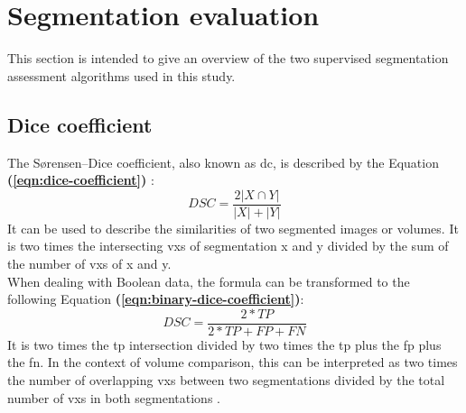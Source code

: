\section{Segmentation evaluation}\label{s:b-seg-eval}
This section is intended to give an overview of the two supervised segmentation assessment algorithms used in this study.

\subsection{Dice coefficient}
The S\o{}rensen–Dice coefficient, also known as \acrfull{dc}, is described by the Equation \textbf{(\ref{eqn:dice-coefficient})} \cite{diceMeasuresAmountEcologic1945}:\\
\begin{equation}\label{eqn:dice-coefficient}
	DSC=\frac{2|X\cap Y|}{|X|+|Y|}
\end{equation}
\noindent
It can be used to describe the similarities of two segmented images or volumes.
It is two times the intersecting \glspl{vx} of segmentation x and y divided by the sum of the number of \glspl{vx} of x and y.\\
When dealing with Boolean data, the formula can be transformed to the following Equation \textbf{(\ref{eqn:binary-dice-coefficient})}:\\
\begin{equation}\label{eqn:binary-dice-coefficient}
	DSC=\frac{2*TP}{2*TP+FP+FN}
\end{equation}
\noindent
It is two times the \acrfull{tp} intersection divided by two times the \acrlong{tp} plus the \acrfull{fp} plus the \acrfull{fn}.
In the context of volume comparison, this can be interpreted as two times the number of overlapping \glspl{vx} between two segmentations divided by the total number of \glspl{vx} in both segmentations \cite{schelbComparisonProstateMRI2021}.\\

